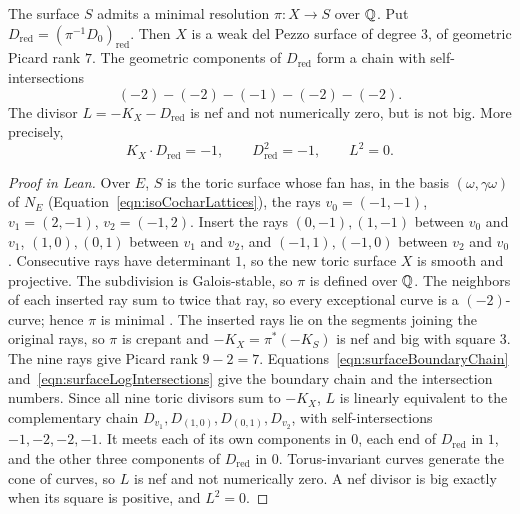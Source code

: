 \begin{proposition}

\label{prop:surfaceResolvedBoundary}


\leanok



 The surface $S$ admits a minimal resolution $\pi\colon X\to S$ over $\mathbb{Q}$. Put $D_{\mathrm{red}}=(\pi^{-1}D_0)_{\mathrm{red}}$. Then $X$ is a weak del Pezzo surface of degree $3$, of geometric Picard rank $7$. The geometric components of $D_{\mathrm{red}}$ form a chain with self-intersections \begin{equation*} (-2)-(-2)-(-1)-(-2)-(-2). \end{equation*} The divisor $L=-K_X-D_{\mathrm{red}}$ is nef and not numerically zero, but is not big. More precisely, \begin{equation*} K_X\cdot D_{\mathrm{red}}=-1,\qquad D_{\mathrm{red}}^2=-1,\qquad L^2=0. \end{equation*} 

\end{proposition}

\begin{proof}[Proof in Lean]

\leanok


Over $E$, $S$ is the toric surface whose fan has, in the basis $(\omega,\gamma\omega)$ of $N_E$ (Equation~\ref{eqn:isoCocharLattices}), the rays $v_0=(-1,-1)$, $v_1=(2,-1)$, $v_2=(-1,2)$. Insert the rays $(0,-1),(1,-1)$ between $v_0$ and $v_1$, $(1,0),(0,1)$ between $v_1$ and $v_2$, and $(-1,1),(-1,0)$ between $v_2$ and $v_0$ \cite[\S2.6]{MR1234037}. Consecutive rays have determinant $1$, so the new toric surface $X$ is smooth and projective. The subdivision is Galois-stable, so $\pi$ is defined over $\mathbb{Q}$. The neighbors of each inserted ray sum to twice that ray, so every exceptional curve is a $(-2)$-curve; hence $\pi$ is minimal \cite[Theorems~V.5.4 and~V.5.7]{hartshorne1977}. The inserted rays lie on the segments joining the original rays, so $\pi$ is crepant and $-K_X=\pi^*(-K_S)$ is nef and big with square $3$. The nine rays give Picard rank $9-2=7$. Equations~\ref{eqn:surfaceBoundaryChain} and~\ref{eqn:surfaceLogIntersections} give the boundary chain and the intersection numbers. Since all nine toric divisors sum to $-K_X$, $L$ is linearly equivalent to the complementary chain $D_{v_1},D_{(1,0)},D_{(0,1)},D_{v_2}$, with self-intersections $-1,-2,-2,-1$. It meets each of its own components in $0$, each end of $D_{\mathrm{red}}$ in $1$, and the other three components of $D_{\mathrm{red}}$ in $0$. Torus-invariant curves generate the cone of curves, so $L$ is nef and not numerically zero. A nef divisor is big exactly when its square is positive, and $L^2=0$.

\end{proof}

